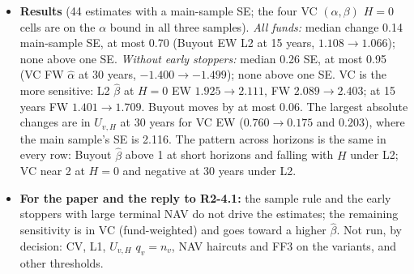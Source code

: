 \documentclass[11pt]{article}
\begin{document}
\begin{itemize}
\item \textbf{Results} (44 estimates with a main-sample SE; the four VC $(\alpha,\beta)$ $H=0$ cells are on the $\alpha$ bound in all three samples). \emph{All funds:} median change 0.14 main-sample SE, at most 0.70 (Buyout EW L2 at 15 years, $1.108\to1.066$); none above one SE. \emph{Without early stoppers:} median 0.26 SE, at most 0.95 (VC FW $\hat\alpha$ at 30 years, $-1.400\to-1.499$); none above one SE. VC is the more sensitive: L2 $\hat\beta$ at $H=0$ EW $1.925\to2.111$, FW $2.089\to2.403$; at 15 years FW $1.401\to1.709$. Buyout moves by at most 0.06. The largest absolute changes are in $U_{v,H}$ at 30 years for VC EW ($0.760\to0.175$ and $0.203$), where the main sample's SE is 2.116. The pattern across horizons is the same in every row: Buyout $\hat\beta$ above 1 at short horizons and falling with $H$ under L2; VC near 2 at $H=0$ and negative at 30 years under L2.
\item \textbf{For the paper and the reply to R2-4.1:} the sample rule and the early stoppers with large terminal NAV do not drive the estimates; the remaining sensitivity is in VC (fund-weighted) and goes toward a higher $\hat\beta$. Not run, by decision: CV, L1, $U_{v,H}$ $q_v=n_v$, NAV haircuts and FF3 on the variants, and other thresholds.
\end{itemize}
\end{document}

